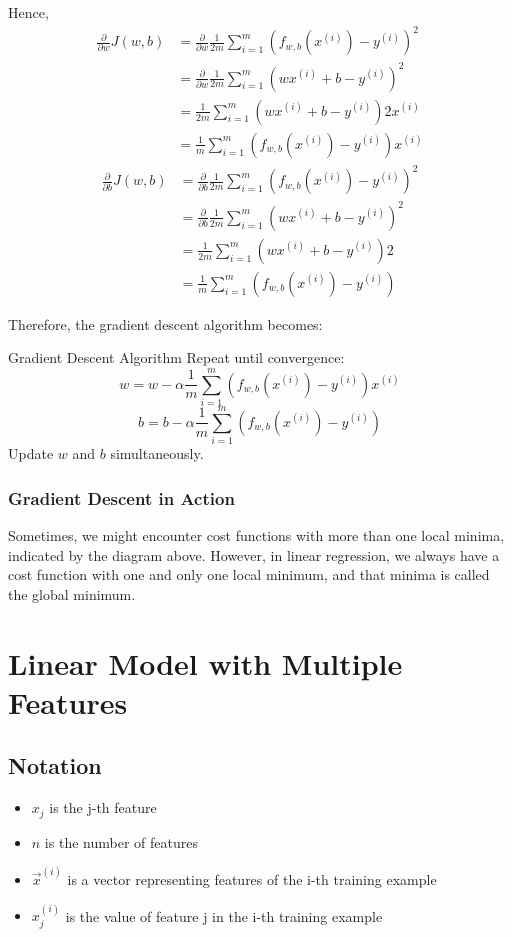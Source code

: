 \documentclass[12pt,a4paper]{article}
\begin{document}
Hence, 
	$$\begin{aligned}
		\frac{\partial}{\partial w}J(w,b)&=\frac{\partial}{\partial w}\frac{1}{2m}\sum_{i=1}^m\left(f_{w,b}(x^{(i)})-y^{(i)}\right)^2\\
		&=\frac{\partial}{\partial w}\frac{1}{2m}\sum_{i=1}^m\left(wx^{(i)}+b-y^{(i)}\right)^2\\
		&=\frac{1}{2m}\sum_{i=1}^m\left(wx^{(i)}+b-y^{(i)}\right)2x^{(i)}\\
		&=\frac{1}{m}\sum_{i=1}^m\left(f_{w,b}(x^{(i)})-y^{(i)}\right)x^{(i)}
	\end{aligned}$$
	$$\begin{aligned}
		\frac{\partial}{\partial b}J(w,b)&=\frac{\partial}{\partial b}\frac{1}{2m}\sum_{i=1}^m\left(f_{w,b}(x^{(i)})-y^{(i)}\right)^2\\
		&=\frac{\partial}{\partial b}\frac{1}{2m}\sum_{i=1}^m\left(wx^{(i)}+b-y^{(i)}\right)^2\\
		&=\frac{1}{2m}\sum_{i=1}^m\left(wx^{(i)}+b-y^{(i)}\right)2\\
		&=\frac{1}{m}\sum_{i=1}^m\left(f_{w,b}(x^{(i)})-y^{(i)}\right)
		\end{aligned}$$

Therefore, the gradient descent algorithm becomes: 
\begin{rmkbox}{Gradient Descent Algorithm}
	Repeat until convergence: 
	$$w=w-\alpha\frac{1}{m}\sum_{i=1}^m\left(f_{w,b}(x^{(i)})-y^{(i)}\right)x^{(i)}$$
	$$b=b-\alpha\frac{1}{m}\sum_{i=1}^m\left(f_{w,b}(x^{(i)})-y^{(i)}\right)$$
	Update $w$ and $b$ simultaneously.
\end{rmkbox}

\subsubsection{Gradient Descent in Action}
\quad Sometimes, we might encounter cost functions with more than one local minima, indicated by the diagram above. However, in linear regression, we always have a cost function with one and only one local minimum, and that minima is called the global minimum. 

\section{Linear Model with Multiple Features}
\subsection{Notation}
\begin{itemize}
	\item $x_j$ is the j-th feature
	\item $n$ is the number of features
	\item $\vec{x}^{(i)}$ is a vector representing features of the i-th training example
	\item $x_j^{(i)}$ is the value of feature j in the i-th training example
\end{itemize}
\end{document}
